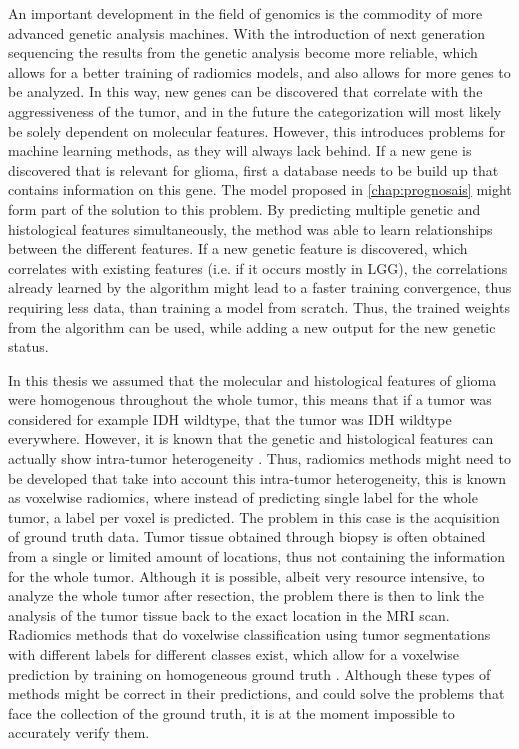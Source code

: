 An important development in the field of genomics is the commodity of more advanced genetic analysis machines.
With the introduction of next generation sequencing the results from the genetic analysis become more reliable, which allows for a better training of radiomics models, and also allows for more genes to be analyzed.
In this way, new genes can be discovered that correlate with the aggressiveness of the tumor, and in the future the categorization will most likely be solely dependent on molecular features.
However, this introduces problems for machine learning methods, as they will always lack behind.
If a new gene is discovered that is relevant for glioma, first a database needs to be build up that contains information on this gene.
The model proposed in \cref{chap:prognosais} might form part of the solution to this problem.
By predicting multiple genetic and histological features simultaneously, the method was able to learn relationships between the different features.
If a new genetic feature is discovered, which correlates with existing features (i.e. if it occurs mostly in \gls{LGG}), the correlations already learned by the algorithm might lead to a faster training convergence, thus requiring less data, than training a model from scratch.
Thus, the trained weights from the algorithm can be used, while adding a new output for the new genetic status.

In this thesis we assumed that the molecular and histological features of glioma were homogenous throughout the whole \gls{tumor}, this means that if a \gls{tumor} was considered for example \gls{IDH} wildtype, that the \gls{tumor} was \gls{IDH} wildtype everywhere.
However, it is known that the genetic and histological features can actually show intra-tumor heterogeneity \autocite{eder2014heterogeneity}.
Thus, radiomics methods might need to be developed that take into account this intra-tumor heterogeneity, this is known as voxelwise radiomics, where instead of predicting single label for the whole \gls{tumor}, a label per voxel is predicted.
The problem in this case is the acquisition of ground truth data.
Tumor tissue obtained through biopsy is often obtained from a single or limited amount of locations, thus not containing the information for the whole \gls{tumor}.
Although it is possible, albeit very resource intensive, to analyze the whole \gls{tumor} after resection, the problem there is then to link the analysis of the \gls{tumor} tissue back to the exact location in the \gls{MRI} scan.
Radiomics methods that do voxelwise classification using \gls{tumor} segmentations with different labels for different classes exist, which allow for a voxelwise prediction by training on homogeneous ground truth \autocite{yogananda20201p19q}.
Although these types of methods might be correct in their predictions, and could solve the problems that face the collection of the ground truth, it is at the moment impossible to accurately verify them.


